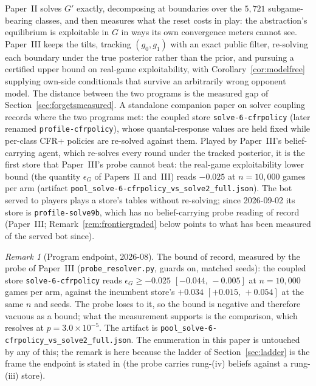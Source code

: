 \documentclass[11pt]{article}
\theoremstyle{plain}
\theoremstyle{definition}
\theoremstyle{remark}
\newtheorem{remark}[theorem]{Remark}
\newcommand{\code}[1]{\texttt{\small #1}}
\begin{document}
Paper~II solves $G'$ exactly, decomposing at boundaries over the $5{,}721$
subgame-bearing classes, and then measures what the reset costs in play:
the abstraction's equilibrium is exploitable in $G$ in ways its own
convergence meters cannot see. Paper~III keeps the tilts, tracking
$(g_0,g_1)$ with an exact public filter, re-solving each boundary under
the true posterior rather than the prior, and pursuing a certified upper
bound on real-game exploitability, with Corollary~\ref{cor:modelfree}
supplying own-side conditionals that survive an arbitrarily wrong opponent
model. The distance between the two programs is the measured gap of
Section~\ref{sec:forgetsmeasured}. A standalone companion paper on solver
coupling records where the two programs met: the coupled store
\code{solve-6-cfrpolicy} (later renamed \code{profile-cfrpolicy}), whose
quantal-response values are held fixed while per-class CFR+ policies are
re-solved against them. Played by Paper~III's belief-carrying agent,
which re-solves every round under the tracked posterior, it is the
first store that Paper~III's probe cannot beat: the real-game
exploitability lower bound (the quantity $\epsilon_G$ of Papers~II
and~III) reads $-0.025$ at $n=10{,}000$ games per arm (artifact
\code{pool\_solve-6-cfrpolicy\_vs\_solve2\_full.json}). The bot served
to players plays a store's tables without re-solving; since 2026-09-02
its store is \code{profile-solve9b}, which has no belief-carrying probe
reading of record (Paper~III; Remark~\ref{rem:frontiergraded} below
points to what has been measured of the served bot since).

\begin{remark}[Program endpoint, 2026-08]\label{rem:endpoint}
The bound of record, measured by the probe of Paper~III
(\code{probe\_resolver.py}, guards on, matched seeds): the coupled
store \code{solve-6-cfrpolicy} reads
$\epsilon_G \ge -0.025$ $[-0.044,\,-0.005]$ at $n=10{,}000$ games per
arm, against the incumbent store's $+0.034$ $[+0.015,\,+0.054]$ at the
same $n$ and seeds. The probe loses to it, so the bound is negative and
therefore vacuous as a bound; what the measurement supports is the
comparison, which resolves at $p=3.0\times10^{-5}$. The artifact is
\code{pool\_solve-6-cfrpolicy\_vs\_solve2\_full.json}. The enumeration in
this paper is untouched by any of this; the remark is here because the
ladder of Section~\ref{sec:ladder} is the frame the endpoint is stated
in (the probe carries rung-(iv) beliefs against a rung-(iii) store).
\end{remark}
\end{document}
